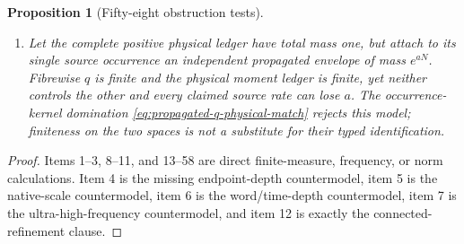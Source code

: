 \documentclass[11pt]{article}
\newtheorem{proposition}[theorem]{Proposition}
\begin{document}
\begin{proposition}[Fifty-eight obstruction tests]
\begin{enumerate}[label=\textup{(T\arabic*)}]
      Tonelli assembly is defined.  The standard-Borel measurable component
      extension in Lemma~\ref{lem:measurable-positive-decomposition} rejects
      this model before any signed recombination.
\item Let the complete positive physical ledger have total mass one, but
      attach to its single source occurrence an independent propagated
      envelope of mass $e^{aN}$.  Fibrewise $q$ is finite and the physical
      moment ledger is finite, yet neither controls the other and every
      claimed source rate can lose $a$.  The occurrence-kernel domination
      \eqref{eq:propagated-q-physical-match} rejects this model; finiteness on
      the two spaces is not a substitute for their typed identification.
\end{enumerate}
\end{proposition}

\begin{proof}
Items 1--3, 8--11, and 13--58 are direct finite-measure, frequency, or norm
calculations.  Item 4 is the missing endpoint-depth countermodel, item 5 is
the native-scale countermodel, item 6 is the word/time-depth countermodel,
item 7 is the ultra-high-frequency countermodel, and item 12 is exactly the
connected-refinement clause.
\end{proof}
\end{document}
